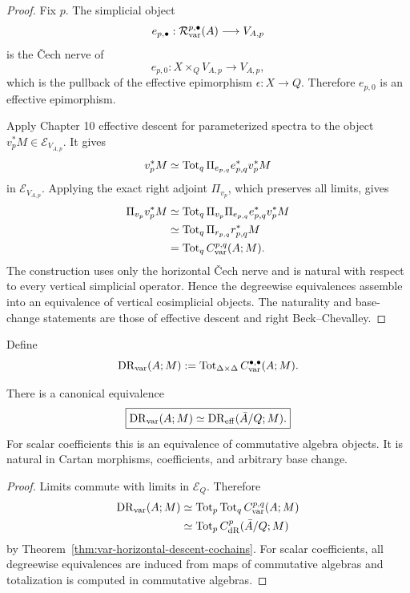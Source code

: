 \begin{proof}
Fix \(p\). The simplicial object
\[
    e_{p,\bullet}:\mathcal R_{\mathrm{var}}^{p,\bullet}(A)\longrightarrow V_{A,p}
\]
is the \v{C}ech nerve of
\[
    e_{p,0}:X\times_QV_{A,p}\longrightarrow V_{A,p},
\]
which is the pullback of the effective epimorphism \(\epsilon:X\to Q\). Therefore \(e_{p,0}\) is an effective epimorphism.

Apply Chapter 10 effective descent for parameterized spectra to the object \(v_p^*M\in\mathcal E_{V_{A,p}}\). It gives
\[
    v_p^*M
    \simeq
    \operatorname{Tot}_q
    \Pi_{e_{p,q}}e_{p,q}^*v_p^*M
\]
in \(\mathcal E_{V_{A,p}}\). Applying the exact right adjoint \(\Pi_{v_p}\), which preserves all limits, gives
\[
\begin{aligned}
    \Pi_{v_p}v_p^*M
    &\simeq
    \operatorname{Tot}_q
    \Pi_{v_p}\Pi_{e_{p,q}}e_{p,q}^*v_p^*M\\
    &\simeq
    \operatorname{Tot}_q
    \Pi_{r_{p,q}}r_{p,q}^*M\\
    &=
    \operatorname{Tot}_qC_{\mathrm{var}}^{p,q}(A;M).
\end{aligned}
\]
The construction uses only the horizontal \v{C}ech nerve and is natural with respect to every vertical simplicial operator. Hence the degreewise equivalences assemble into an equivalence of vertical cosimplicial objects. The naturality and base-change statements are those of effective descent and right Beck--Chevalley.
\end{proof}

\begin{definition}
\label{def:var-total-dr}
Define
\[
    \mathrm{DR}_{\mathrm{var}}(A;M)
    :=
    \operatorname{Tot}_{\Delta\times\Delta}
    C_{\mathrm{var}}^{\bullet,\bullet}(A;M).
\]
\end{definition}

\begin{theorem}
\label{thm:var-total-identification}
There is a canonical equivalence
\[
    \boxed{
    \mathrm{DR}_{\mathrm{var}}(A;M)
    \simeq
    \mathrm{DR}_{\mathrm{eff}}(\bar A/Q;M).
    }
\]
For scalar coefficients this is an equivalence of commutative algebra objects. It is natural in Cartan morphisms, coefficients, and arbitrary base change.
\end{theorem}

\begin{proof}
Limits commute with limits in \(\mathcal E_Q\). Therefore
\[
\begin{aligned}
    \mathrm{DR}_{\mathrm{var}}(A;M)
    &\simeq
    \operatorname{Tot}_p\operatorname{Tot}_qC_{\mathrm{var}}^{p,q}(A;M)\\
    &\simeq
    \operatorname{Tot}_p C_{\mathrm{dR}}^p(\bar A/Q;M)
\end{aligned}
\]
by Theorem~\ref{thm:var-horizontal-descent-cochains}. For scalar coefficients, all degreewise equivalences are induced from maps of commutative algebras and totalization is computed in commutative algebras.
\end{proof}

